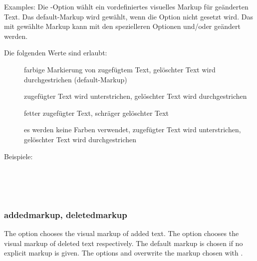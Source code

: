 	Examples:
\fi
	\ifGERMAN
		Die -Option wählt ein vordefiniertes visuelles Markup für geänderten Text.
		Das default-Markup wird gewählt, wenn die Option nicht gesetzt wird.
		Das mit  gewählte Markup kann mit den spezielleren Optionen  und/oder  geändert werden.

		Die folgenden Werte sind erlaubt:
		\begin{description}
			\item [] farbige Markierung von zugefügtem Text, gelöschter Text wird durchgestrichen (default-Markup)
			\item [] zugefügter Text wird unterstrichen, gelöschter Text wird durchgestrichen
			\item [] fetter zugefügter Text, schräger gelöschter Text
			\item [] es werden keine Farben verwendet, zugefügter Text wird unterstrichen, gelöschter Text wird durchgestrichen
		\end{description}

		Beispiele:
	\fi

\\
\\
\\

\subsubsection{addedmarkup, deletedmarkup}
\ifENGLISH
	The  option chooses the visual markup of added text.
	The  option chooses the visual markup of deleted text respectively.
	The default markup is chosen if no explicit markup is given.
	The options  and  overwrite the markup chosen with .

